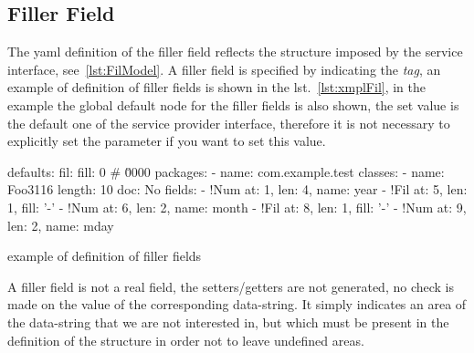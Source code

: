 \subsection{Filler Field} \label{sub:yaml.fil}
The yaml definition of the filler field reflects the structure imposed by the 
service interface, see~\ref{lst:FilModel}. 
A filler field is specified by indicating the 
 \textsl{tag}, an example of 
definition of filler fields is shown in the lst.~\ref{lst:xmplFil}, in the 
example the global default node for the filler fields is also shown, the set 
value is the default one of the service provider interface, therefore it is not 
necessary to explicitly set the parameter if you want to set this value.

\begin{elisting}[!htb]
\begin{yamlcode}
defaults:
  fil:
    fill: 0             # \u0000
packages:
  - name: com.example.test
    classes:
      - name: Foo3116
        length: 10
        doc: No
        fields:
          - !Num { at: 1, len: 4, name: year }
          - !Fil { at: 5, len: 1, fill: '-' }
          - !Num { at: 6, len: 2, name: month }
          - !Fil { at: 8, len: 1, fill: '-' }
          - !Num { at: 9, len: 2, name: mday }
\end{yamlcode}
\caption{example of definition of filler fields}
\label{lst:xmplFil}
\end{elisting}
A filler field is not a real field, the setters/getters are not generated, no 
check is made on the value of the corresponding data-string. It simply indicates 
an area of the data-string that we are not interested in, but which must be 
present in the definition of the structure in order not to leave undefined areas.

